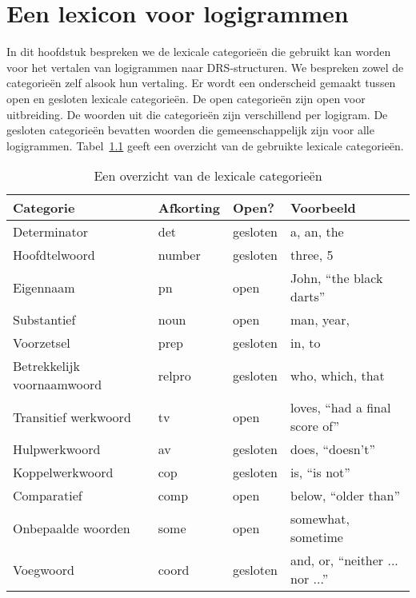 \chapter{Een lexicon voor logigrammen}
\label{ch:lexicon}
In dit hoofdstuk bespreken we de lexicale categorieën die gebruikt kan worden voor het vertalen van logigrammen naar DRS-structuren. We bespreken zowel de categorieën zelf alsook hun vertaling. Er wordt een onderscheid gemaakt tussen open en gesloten lexicale categorieën. De open categorieën zijn open voor uitbreiding. De woorden uit die categorieën zijn verschillend per logigram. De gesloten categorieën bevatten woorden die gemeenschappelijk zijn voor alle logigrammen. Tabel~\ref{tbl:lexiconCategories} geeft een overzicht van de gebruikte lexicale categorieën.

\begin{table}[t]
  \centering
  \begin{tabular}{llll}
    \toprule
    \textbf{Categorie} & \textbf{Afkorting} & \textbf{Open?} & \textbf{Voorbeeld}  \\ \midrule
    Determinator       & det                & gesloten & a, an, the \\
    Hoofdtelwoord      & number             & gesloten & three, 5      \\
    Eigennaam          & pn                 & open     & John, ``the black darts'' \\
    Substantief        & noun               & open     & man, year, \\
    Voorzetsel         & prep               & gesloten & in, to \\
    Betrekkelijk voornaamwoord & relpro     & gesloten & who, which, that \\
    Transitief werkwoord & tv               & open     & loves, ``had a final score of'' \\
    Hulpwerkwoord      & av                 & gesloten & does, ``doesn't'' \\
    Koppelwerkwoord    & cop                & gesloten & is, ``is not'' \\
    Comparatief        & comp               & open     & below, ``older than'' \\
    Onbepaalde woorden & some               & open     & somewhat, sometime \\
    Voegwoord          & coord              & gesloten & and, or, ``neither ... nor ...'' \\
    \bottomrule
  \end{tabular}
  \caption{Een overzicht van de lexicale categorieën}
  \label{tbl:lexiconCategories}
\end{table}

